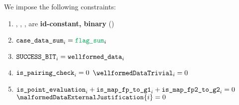 We impose the following constraints:
\begin{enumerate}
    \item \malformedDataInternalJustification{}, \malformedDataExternalJustification{}, \wellformedDataTrivial{}, \wellformedDataNonTrivial{}  are \textbf{id-constant, binary} \quad (\trash)
    \item $\locCaseDataSum_{i} = \locFlagSum_{i}$
    \item $\texttt{SUCCESS\_BIT}_{i} = \texttt{wellformed\_data}_{i}$
    \item \If $\texttt{is\_pairing\_check}_{i} = 0$ \Then $\wellformedDataTrivial_{i} = 0$
    \item \If $\texttt{is\_point\_evaluation}_{i} + \texttt{is\_map\_fp\_to\_g1}_{i} + \texttt{is\_map\_fp2\_to\_g2}_{i} = 0$ \Then $\malformedDataExternalJustification{i} = 0$
\end{enumerate}